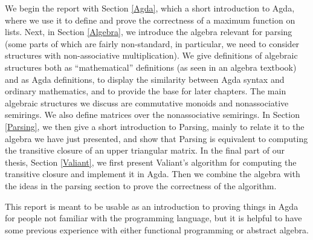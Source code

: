 

We begin the report with Section \ref{Agda}, which a short introduction to Agda, where we use it to define and prove the correctness of a maximum function on lists. Next, in Section \ref{Algebra}, we introduce the algebra relevant for parsing (some parts of which are fairly non-standard, in particular, we need to consider structures with non-associative multiplication). We give definitions of algebraic structures both as ``mathematical'' definitions (as seen in an algebra textbook) and as Agda definitions, to display the similarity between Agda syntax and ordinary mathematics, and to provide the base for later chapters. The main algebraic structures we discuss are commutative monoids and nonassociative semirings. We also define matrices over the nonassociative semirings. In Section \ref{Parsing}, we then give a short introduction to Parsing, mainly to relate it to the algebra we have just presented, and show that Parsing is equivalent to computing the transitive closure of an upper triangular matrix. In the final part of our thesis, Section \ref{Valiant}, we first present Valiant's algorithm for computing the transitive closure and implement it in Agda. Then we combine the algebra with the ideas in the parsing section to prove the correctness of the algorithm.

This report is meant to be usable as an introduction to proving things in Agda for people not familiar with the programming language, but it is helpful to have some previous experience with either functional programming or abstract algebra.
